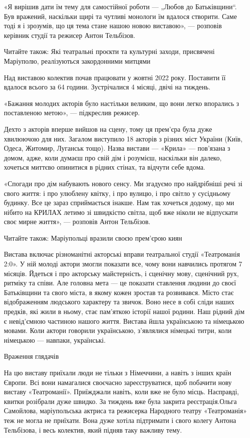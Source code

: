 «Я вирішив дати їм тему для самостійної роботи — „Любов до Батьківщини“. Був
вражений, наскільки щирі та чутливі монологи їм вдалося створити. Саме тоді я і
зрозумів, що ця тема стане нашою новою виставою», — розповів керівник студії та
режисер Антон Тельбізов.

Читайте також: Які театральні проєкти та культурні заходи, присвячені
Маріуполю, реалізуються закордонними митцями

Над виставою колектив почав працювати у жовтні 2022 року. Поставити її вдалося
всього за 64 години. Зустрічалися 4 місяці, двічі на тиждень.

«Бажання молодих акторів було настільки великим, що вони легко впорались з
поставленою метою», — підкреслив режисер.

Дехто з акторів вперше вийшов на сцену, тому ця прем'єра була дуже хвилюючою
для них. Загалом виступило 18 акторів з різних міст України (Київ, Одеса,
Житомир, Луганськ тощо). Назва вистави — «Крила» — пов'язана з домом, адже,
коли думаєш про свій дім і розумієш, наскільки він далеко, хочеться миттєво
опинитися в рідних стінах, та відчути себе вдома.

«Спогади про дім набувають нового сенсу. Ми згадуємо про найдрібніші речі зі
свого життя: і про улюблену квітку, і про вулицю, і про світло у сусідньому
будинку. Все це зараз сприймається інакше. Нам так хочеться додому, що ми
нібито на КРИЛАХ летимо зі швидкістю світла, щоб вже ніколи не відпускати своє
мирне життя», — розповів Антон Тельбізов.

Читайте також: Маріупольці вразили своєю прем'єрою киян

Вистава включає різноманітні акторські вправи театральної студії «Театроманія
2:0». У ній молоді актори змогли показати все, чому вони навчились протягом 7
місяців. Йдеться і про акторську майстерність, і сценічну мову, сценічний рух,
ритміку та співи. Але головна мета — це показати ставлення людини до своєї
Батьківщини та свого міста, в якому кожен зростав та розвивався. Місто стає
відображенням людського характеру та звичок. Воно несе в собі сліди наших
предків, які жили в ньому, стає пам'яткою історії нашої родини. Наш рідний дім
є невід'ємною частиною нашого життя. Вистава йшла українською та німецькою
мовами. Коли актори говорили українською, з'являлися німецькі титри, коли
німецькою — навпаки, українські.

Враження глядачів

На цю виставу приїхали люди не тільки з Німеччини, а навіть з інших країн
Європи. Всі вони намагалися своєчасно зареєструватися, щоб побачити нову
виставу «Театроманії». Приїжджали навіть, коли вже не було місць. Насправді,
квитки розібрали дуже швидко. За тиждень вже була закрита реєстрація.Ольга
Самойлова, маріупольська актриса та режисерка Народного театру «Театроманія»
теж не могла не приїхати. Вона дуже хотіла підтримати і свого колегу Антона
Тельбізова, і весь колектив, який підняв таку важливу тему.

